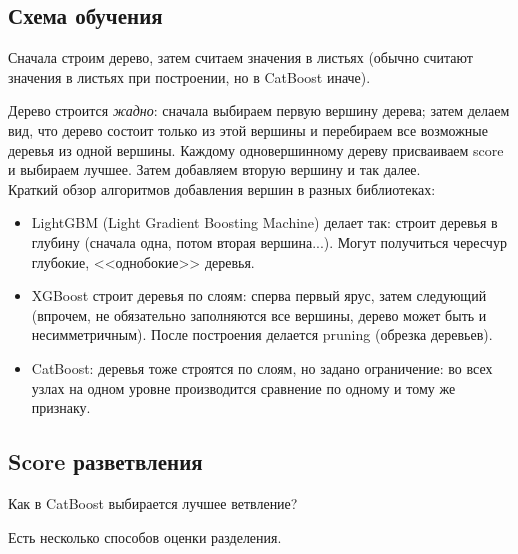 \documentclass[a4paper,12pt]{article}
\begin{document}
\subsection{Схема обучения}

Сначала строим дерево, затем считаем значения в листьях (обычно считают значения в листьях при построении, но в CatBoost иначе).

Дерево строится \textit{жадно}: сначала выбираем первую вершину дерева; затем делаем вид, что дерево состоит только из этой вершины и перебираем все возможные деревья из одной вершины.
Каждому одновершинному дереву присваиваем score и выбираем лучшее.
Затем добавляем вторую вершину и так далее. \\

Краткий обзор алгоритмов добавления вершин в разных библиотеках:
\begin{itemize}[noitemsep]
    \item LightGBM (Light Gradient Boosting Machine) делает так: строит деревья в глубину (сначала одна, потом вторая вершина...).
    Могут получиться чересчур глубокие, <<однобокие>> деревья.
    \item XGBoost строит деревья по слоям: сперва первый ярус, затем следующий (впрочем, не обязательно заполняются все вершины, дерево может быть и несимметричным).
    После построения делается pruning (обрезка деревьев).
    \item CatBoost: деревья тоже строятся по слоям, но задано ограничение: во всех узлах на одном уровне производится сравнение по одному и тому же признаку.
\end{itemize}

\subsection{Score разветвления}

Как в CatBoost выбирается лучшее ветвление?

Есть несколько способов оценки разделения.
\end{document}
